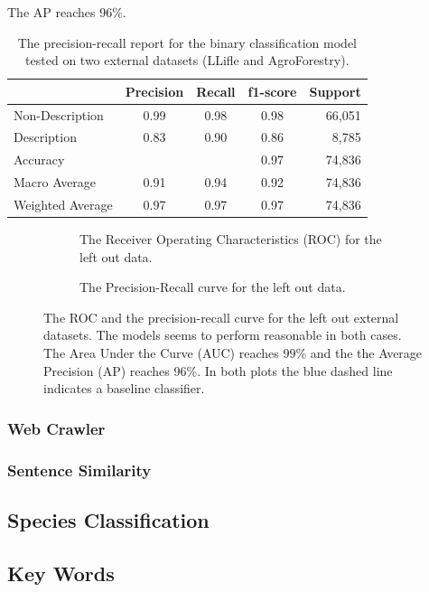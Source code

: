 \documentclass[a4paper, 12pt, oneside]{book} %
\begin{document}
The AP reaches 96\%.
\begin{table}[h]
    \centering
    \caption{The precision-recall report for the binary classification model tested on two external datasets (LLifle and AgroForestry).}
    \label{tab:precision_recall_descriptionsmodel_external}
    \begin{tabular}{@{}lcccr@{}}
    \cmidrule(l){2-5}
     & \multicolumn{1}{l}{Precision} & \multicolumn{1}{l}{Recall} & \multicolumn{1}{l}{f1-score} & \multicolumn{1}{l}{Support} \\ \midrule
    Non-Description  & 0.99 & 0.98 & 0.98 & 66,051 \\
    Description      & 0.83 & 0.90 & 0.86 & 8,785  \\ \midrule
    Accuracy         &      &      & 0.97 & 74,836 \\
    Macro Average    & 0.91 & 0.94 & 0.92 & 74,836 \\
    Weighted Average & 0.97 & 0.97 & 0.97 & 74,836 \\ \bottomrule
    \end{tabular}
\end{table}

\begin{figure} [h]
     \centering
     \begin{subfigure}[b]{0.49\textwidth}
         \centering
         
         \caption{The Receiver Operating Characteristics (ROC) for the left out data.}
         \label{fig:ROC_test_external}
     \end{subfigure}
     \hfill
     \begin{subfigure}[b]{0.49\textwidth}
         \centering
         
         \caption{The Precision-Recall curve for the left out data.}
         \label{fig:precision_recall_curve_test_external}
     \end{subfigure}
     \caption{The ROC and the precision-recall curve for the left out external datasets. The models seems to perform reasonable in both cases. The Area Under the Curve (AUC) reaches 99\% and the the Average Precision (AP) reaches 96\%. In both plots the blue dashed line indicates a baseline classifier.}
\end{figure}

\subsubsection{Web Crawler}
\subsubsection{Sentence Similarity}

\subsection{Species Classification}
\subsection{Key Words}

\printbibliography
\end{document}

